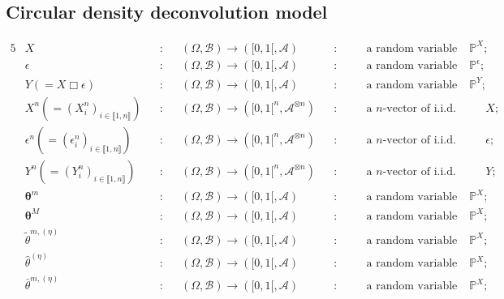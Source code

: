 \subsection*{Circular density deconvolution model}
\begin{alignat*}{5}
& X &&:&& (\Omega, \mathcal{B}) \rightarrow ([0,1[, \mathcal{A}) &&: && \quad \text{a random variable with distribution } \mathds{P}^{X};\\
& \epsilon &&:&& (\Omega, \mathcal{B}) \rightarrow ([0,1[, \mathcal{A})  &&: && \quad \text{a random variable with distribution } \mathds{P}^{\epsilon};\\
& Y (=X \Box \epsilon) &&:&& (\Omega, \mathcal{B}) \rightarrow ([0,1[, \mathcal{A})  &&: && \quad \text{a random variable with distribution } \mathds{P}^{Y};\\
& X^{n} (=(X^{n}_{i})_{i \in \llbracket 1, n \rrbracket}) &&:&& (\Omega, \mathcal{B}) \rightarrow ([0,1[^{n}, \mathcal{A}^{\otimes n}) &&: && \quad \text{a } n \text{-vector of i.i.d. replications of } X;\\
& \epsilon^{n} (=(\epsilon^{n}_{i})_{i \in \llbracket 1, n \rrbracket})&&:&& (\Omega, \mathcal{B}) \rightarrow ([0,1[^{n}, \mathcal{A}^{\otimes n}) &&: && \quad \text{a } n \text{-vector of i.i.d. replications of } \epsilon;\\
& Y^{n} (=(Y^{n}_{i})_{i \in \llbracket 1, n \rrbracket}) &&:&& (\Omega, \mathcal{B}) \rightarrow ([0,1[^{n}, \mathcal{A}^{\otimes n})  &&: && \quad \text{a } n \text{-vector of i.i.d. replications of } Y;\\
& \boldsymbol{\theta}^{m} &&:&& (\Omega, \mathcal{B}) \rightarrow ([0,1[, \mathcal{A}) &&: && \quad \text{a random variable with distribution } \mathds{P}^{X};\\
& \boldsymbol{\theta}^{M} &&:&& (\Omega, \mathcal{B}) \rightarrow ([0,1[, \mathcal{A}) &&: && \quad \text{a random variable with distribution } \mathds{P}^{X};\\
& \widetilde{\theta}^{m, (\eta)} &&:&& (\Omega, \mathcal{B}) \rightarrow ([0,1[, \mathcal{A}) &&: && \quad \text{a random variable with distribution } \mathds{P}^{X};\\
& \widehat{\theta}^{(\eta)} &&:&& (\Omega, \mathcal{B}) \rightarrow ([0,1[, \mathcal{A}) &&: && \quad \text{a random variable with distribution } \mathds{P}^{X};\\
& \bar{\theta}^{m, (\eta)} &&:&& (\Omega, \mathcal{B}) \rightarrow ([0,1[, \mathcal{A}) &&: && \quad \text{a random variable with distribution } \mathds{P}^{X};
\end{alignat*}

